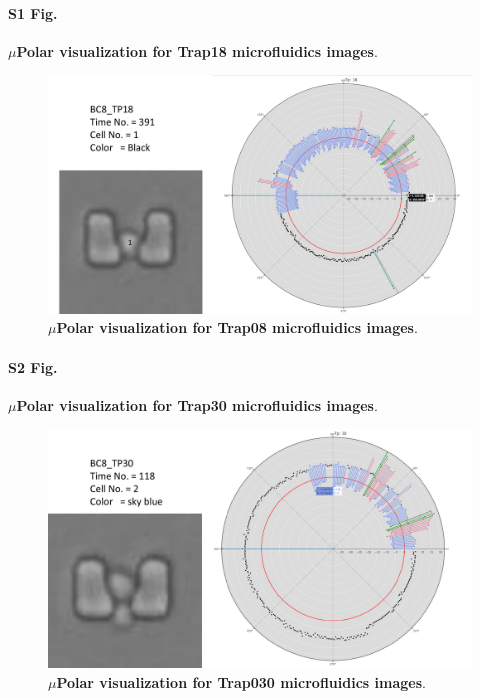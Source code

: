 \documentclass[conference]{IEEEtran}
\begin{document}
\paragraph*{S1 Fig.}
\label{S1_Fig}
{\bf  $\mu$Polar visualization for Trap18 microfluidics images}. 


 
\begin{figure}
\centering
\includegraphics[width=\textwidth,height=10 cm]{Patterns/bc8_tp18.pdf}
\caption{ \textbf{$\mu$Polar visualization for Trap08 microfluidics images}.}
\label{fig:tp18}
\end{figure}


\paragraph*{S2 Fig.}
\label{S4_Fig}
{\bf  $\mu$Polar visualization for Trap30 microfluidics images}. 

\begin{figure}
\centering
\includegraphics[width=\textwidth,height=10 cm]{Patterns/bc8_tp30.pdf}
\caption{  \textbf{$\mu$Polar visualization for Trap030 microfluidics images}.}
\label{fig:tp30}
\end{figure}
\end{document}
